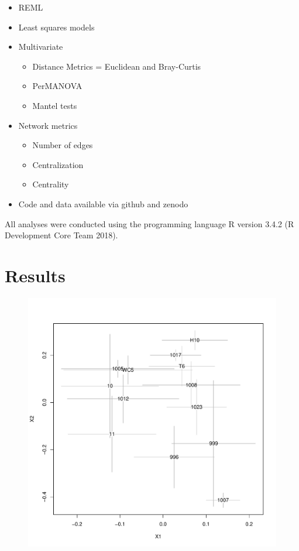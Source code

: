\documentclass[9pt,twocolumn,twoside,lineno]{pnas-new}
\begin{document}
{\begin{itemize}
  \item REML
  \item Least squares models
  \item Multivariate
    \begin{itemize}
    \item Distance Metrics = Euclidean and Bray-Curtis
    \item PerMANOVA
    \item Mantel tests
    \end{itemize}
  \item Network metrics
    \begin{itemize}
    \item Number of edges
    \item Centralization
    \item Centrality
    \end{itemize}
  \item Code and data available via github and zenodo
\end{itemize}

All analyses were conducted using the programming language R version
3.4.2 (R Development Core Team 2018).

\section*{Results}



\begin{figure}[ht]
\centering
\includegraphics[width=\linewidth]{com_chplot_onc.pdf}
\caption{}
\label{fig:com_ch_plot}
\end{figure}


}
\end{document}
